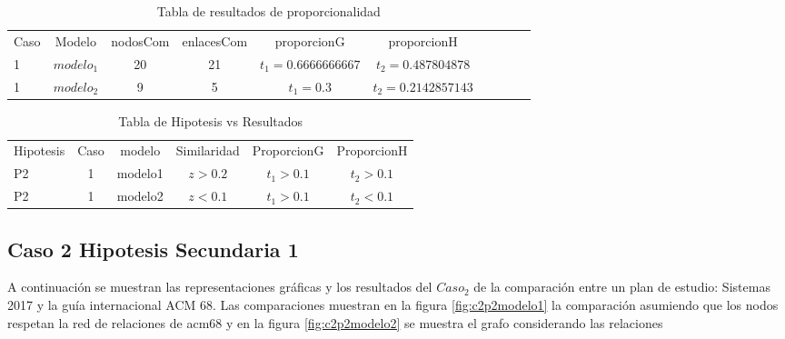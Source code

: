 \begin{table}[H]
\centering
\caption{Tabla de resultados de proporcionalidad}
\begin{tabular}[t]{lccccccccc}
\hline
Caso & Modelo & nodosCom & enlacesCom & proporcionG &proporcionH \\
1 & $modelo_1$ & 20 & 21 & $t_1=0.6666666667$ & $t_2=0.487804878$ \\
1 & $modelo_2$ & 9 & 5 & $t_1=0.3 $ & $t_2=0.2142857143$ \\
\hline
\end{tabular}
\label{tab:tabresultados2_P2}
\end{table}

\begin{table}[H]
\centering
\caption{Tabla de Hipotesis vs Resultados }
\begin{tabular}[t]{lccccc}
\hline
Hipotesis & Caso & modelo & Similaridad & ProporcionG & ProporcionH\\
P2 & 1 & modelo1 & $z>0.2$ & $t_1>0.1$ & $t_2>0.1$ \\
P2 & 1 &modelo2 & $z<0.1$ & $t_1>0.1$ & $t_2<0.1$\\
\hline
\end{tabular}
\label{tab:hipotesis_P2}
\end{table}

\clearpage

\subsection{Caso 2 Hipotesis Secundaria 1}

A continuación se muestran las representaciones gráficas y los resultados del $Caso_2$ de la comparación entre un plan de estudio: Sistemas 2017 y la guía internacional ACM 68. Las comparaciones muestran en la figura \ref{fig:c2p2modelo1} la comparación asumiendo que los nodos respetan la red de relaciones de acm68 y en la figura \ref{fig:c2p2modelo2} se muestra el grafo considerando las relaciones 

